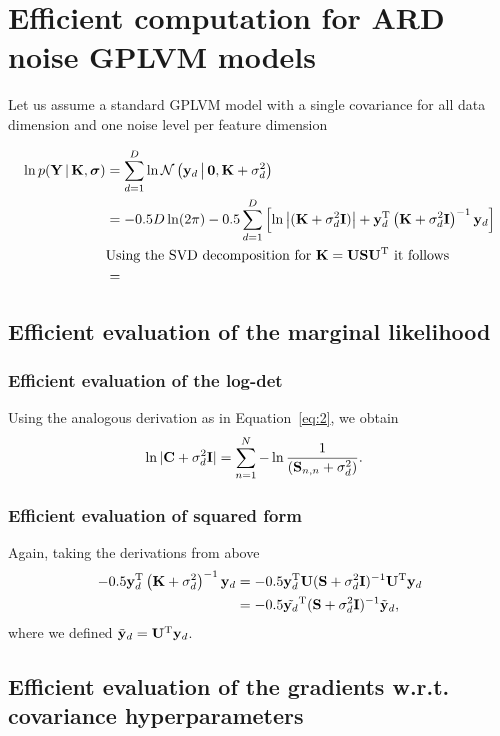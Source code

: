 \documentclass{article}
\newcommand{\B}[1]{{\bf{#1}}}
\begin{document}
\section{Efficient computation for ARD noise GPLVM models}
\label{sec:effic-comp-ard}
Let us assume a standard GPLVM model with a single covariance for all
data dimension and one noise level per feature dimension

\begin{align*}
  \ln p({\bf Y} \,|\, {\bf K}, \mbox{\boldmath $\sigma$}) &= \sum_{d=1}^{D} 
\ln \mathcal{N}\left({\bf y}_d \,\middle | \, {\bf 0},{\bf K} + \sigma_{d}^2\right) \\
 & = -0.5 D \ln (2\pi) - 0.5 \sum_{d=1}^{D}  \left [\ln \left | ({\bf K} +
   \sigma_d^2 {\bf I})\right | + {\bf y}_d^{{\rm T}} \left ({\bf K} + \sigma_d^2
   {\bf I}\right )^{-1} {\bf y}_d \right ]\\
&\text{Using the SVD decomposition for ${\bf K}={\bf U} {\bf S} {\bf U}^{{\rm T}}$ it
  follows}\\
& = 
\end{align*}

\subsection{Efficient evaluation of the marginal likelihood}

\subsubsection{Efficient evaluation of the log-det}
Using the analogous derivation as in Equation~\eqref{eq:2}, we obtain
\begin{align}&
\label{eq:2}
\ln | \B{C} + \sigma_{d}^{2} \B{I}|  
 = \sum_{n=1}^{N} -\ln \frac{1}{(\B{S}_{n,n} + \sigma_d^2)}.
\end{align}

\subsubsection{Efficient evaluation of squared form}
Again, taking the derivations from above
\begin{align*}
-0.5 {\bf y}_d^{{\rm T}} \left({\bf K} + \sigma_d^{2} \right)^{-1} {\bf y}_d & = -0.5
{\bf y}_{d}^{{\rm T}} {\bf U} ({\bf S} + \sigma_d^{2} {\bf I})^{-1} {\bf U}^{{\rm T}} {\bf y}_d
\\
& = -0.5 \tilde{{\bf y}_d}^{{\rm T}} ({\bf S} + \sigma_d^{2} {\bf I})^{-1} \tilde{{\bf y}}_d,
\end{align*}
where we defined $\tilde{{\bf y}}_d = {\bf U}^{{\rm T}} {\bf y}_d$.

\subsection{Efficient evaluation of the gradients w.r.t. covariance
  hyperparameters}
\end{document}
